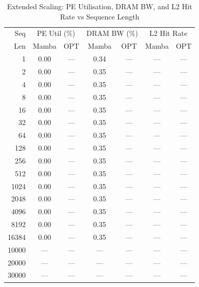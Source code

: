 \begin{table}[h]\centering
    \caption{Extended Scaling: PE Utilisation, DRAM BW, and L2 Hit Rate vs Sequence Length}
    \label{tab:seq_scaling_extended}
    \begin{tabular}{r cc cc cc}\hline
        Seq & \multicolumn{2}{c}{PE Util (\%)} & \multicolumn{2}{c}{DRAM BW (\%)} & \multicolumn{2}{c}{L2 Hit Rate} \\
    Len & Mamba & OPT & Mamba & OPT & Mamba & OPT \\\hline
        1 & 0.00 & --- & 0.34 & --- & --- & --- \\
        2 & 0.00 & --- & 0.35 & --- & --- & --- \\
        4 & 0.00 & --- & 0.35 & --- & --- & --- \\
        8 & 0.00 & --- & 0.35 & --- & --- & --- \\
       16 & 0.00 & --- & 0.35 & --- & --- & --- \\
       32 & 0.00 & --- & 0.35 & --- & --- & --- \\
       64 & 0.00 & --- & 0.35 & --- & --- & --- \\
      128 & 0.00 & --- & 0.35 & --- & --- & --- \\
      256 & 0.00 & --- & 0.35 & --- & --- & --- \\
      512 & 0.00 & --- & 0.35 & --- & --- & --- \\
     1024 & 0.00 & --- & 0.35 & --- & --- & --- \\
     2048 & 0.00 & --- & 0.35 & --- & --- & --- \\
     4096 & 0.00 & --- & 0.35 & --- & --- & --- \\
     8192 & 0.00 & --- & 0.35 & --- & --- & --- \\
    16384 & 0.00 & --- & 0.35 & --- & --- & --- \\
    10000 & --- & --- & --- & --- & --- & --- \\
    20000 & --- & --- & --- & --- & --- & --- \\
    30000 & --- & --- & --- & --- & --- & --- \\
\hline\end{tabular}\end{table}